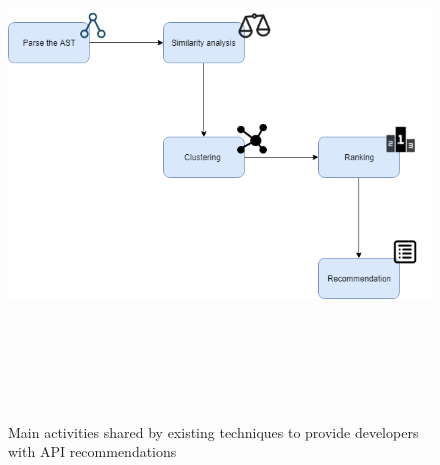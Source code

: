 \begin{figure}[!h]
	\includegraphics[width=12cm,height=14cm,keepaspectratio]{images/approach.png}
	\centering
	\caption{Main activities shared by existing techniques to provide 
	developers with API recommendations}
	\label{fig:apiRecommendationExistingApproaches}
\end{figure}










